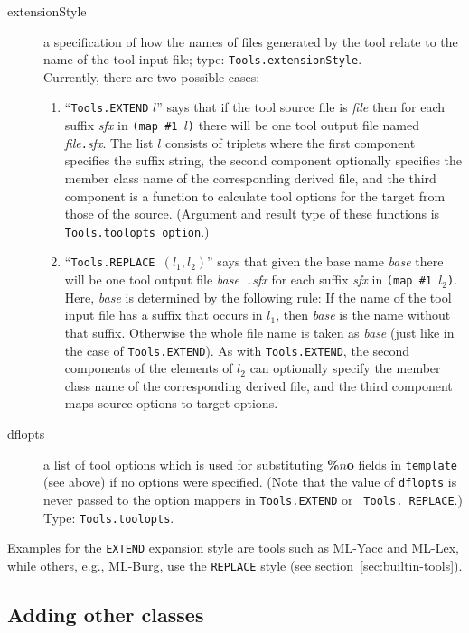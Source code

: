 \begin{description}
\item[extensionStyle] a specification of how the names of files
generated by the tool relate to the name of the tool input file;
type: {\tt Tools.extensionStyle}. \\
Currently, there are two possible cases:
\begin{enumerate}
\item ``{\tt Tools.EXTEND} $l$'' says that if the tool source file is
{\it file} then for each suffix {\it sfx} in {\tt (map \#1 $l$)} there
will be one tool output file named {\it file}{\tt .}{\it sfx}.  The
list $l$ consists of triplets where the first component specifies the
suffix string, the second component optionally specifies the
member class name of the corresponding derived file, and the
third component is a function to calculate tool options for the 
target from those of the source. (Argument and result type of these
functions is {\tt Tools.toolopts option}.)
\item ``{\tt Tools.REPLACE }$(l_1, l_2)$'' says that given the
base name {\it base} there will be one tool output file {\it base}{\tt
.}{\it sfx} for each suffix {\it sfx} in {\tt (map \#1 $l_2$)}.  Here,
{\it base} is determined by the following rule: If the name of the
tool input file has a suffix that occurs in $l_1$, then {\it base} is
the name without that suffix.  Otherwise the whole file name is taken
as {\it base} (just like in the case of {\tt Tools.EXTEND}).  As with
{\tt Tools.EXTEND}, the second components of the elements of $l_2$ can
optionally specify the member class name of the corresponding derived
file, and the third component maps source options to target options.
\end{enumerate}
\item[dflopts] a list of tool options which is used for
substituting {\bf \%$n$o} fields in {\tt template} (see above) if no
options were specified.  (Note that the value of {\tt dflopts} is never
passed to the option mappers in {\tt Tools.EXTEND} or {\tt
Tools. REPLACE}.)  Type: {\tt Tools.toolopts}.
\end{description}

Examples for the {\tt EXTEND} expansion style are tools such as
ML-Yacc and ML-Lex, while others, e.g., ML-Burg, use the {\tt REPLACE}
style (see section~\ref{sec:builtin-tools}).

\subsection{Adding other classes}

